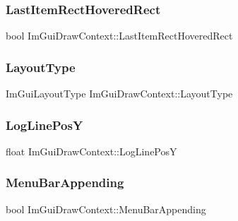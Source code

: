 \hypertarget{struct_im_gui_draw_context_ad6f4bf282ceef2a07cf25a59008feb16}{}\label{struct_im_gui_draw_context_ad6f4bf282ceef2a07cf25a59008feb16} 
\subsubsection{\texorpdfstring{Last\+Item\+Rect\+Hovered\+Rect}{LastItemRectHoveredRect}}
{\footnotesize\ttfamily bool Im\+Gui\+Draw\+Context\+::\+Last\+Item\+Rect\+Hovered\+Rect}

\hypertarget{struct_im_gui_draw_context_a8516b32e30504c3037d34e93b7988d83}{}\label{struct_im_gui_draw_context_a8516b32e30504c3037d34e93b7988d83} 
\subsubsection{\texorpdfstring{Layout\+Type}{LayoutType}}
{\footnotesize\ttfamily Im\+Gui\+Layout\+Type Im\+Gui\+Draw\+Context\+::\+Layout\+Type}

\hypertarget{struct_im_gui_draw_context_a4060735d06c860014c5359bcf76b1112}{}\label{struct_im_gui_draw_context_a4060735d06c860014c5359bcf76b1112} 
\subsubsection{\texorpdfstring{Log\+Line\+PosY}{LogLinePosY}}
{\footnotesize\ttfamily float Im\+Gui\+Draw\+Context\+::\+Log\+Line\+PosY}

\hypertarget{struct_im_gui_draw_context_a01e52aff3f5efc13fcf6af213cf417c2}{}\label{struct_im_gui_draw_context_a01e52aff3f5efc13fcf6af213cf417c2} 
\subsubsection{\texorpdfstring{Menu\+Bar\+Appending}{MenuBarAppending}}
{\footnotesize\ttfamily bool Im\+Gui\+Draw\+Context\+::\+Menu\+Bar\+Appending}

